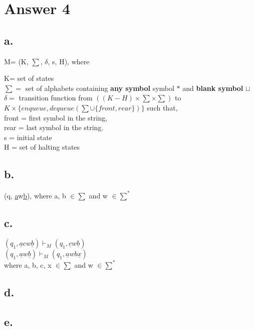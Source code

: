 \documentclass[12pt]{article}
\begin{document}
\section*{Answer 4}

\subsection*{a.}
M= (K, $\sum$, $\delta$, s, H), where
\begin{center}
    K= set of states\\
    $\sum =$ set of alphabets containing \textbf{any symbol} symbol $\ast$ and  \textbf{blank symbol} $\sqcup$\\
    $\delta=$ transition function from $((K-H) \times \sum \times \sum )$ to $K \times \{enqueue, dequeue(\sum \cup \{front, rear\}) \}$ such that,\\
    front = first symbol in the string,\\
    rear = last symbol in the string.\\
    s = initial state\\
    H = set of halting states
\end{center}

\subsection*{b.}
(q, \underline{a}w\underline{b}), where a, b $\in \sum$ and w $\in \sum^*$

\subsection*{c.}
\begin{center}
    $(q_1, \underline{a}cw\underline{b}) \vdash_M (q_1, \underline{c}w\underline{b})$\\
    $(q_1, \underline{a}w\underline{b}) \vdash_M (q_1, \underline{a}wb\underline{x})$\\
    where a, b, c, x $\in \sum$ and w $\in \sum^*$
\end{center}

\subsection*{d.}

\subsection*{e.}
\end{document}
